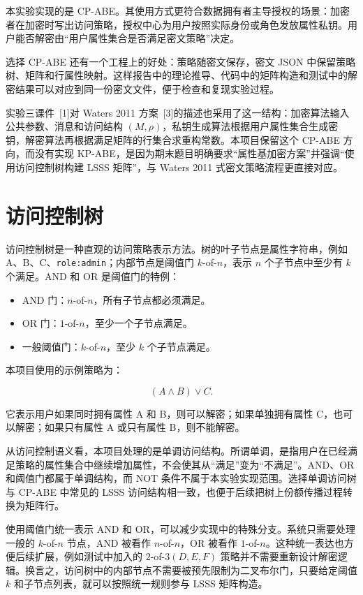 本实验实现的是 CP-ABE。其使用方式更符合数据拥有者主导授权的场景：加密者在加密时写出访问策略，授权中心为用户按照实际身份或角色发放属性私钥。用户能否解密由“用户属性集合是否满足密文策略”决定。

选择 CP-ABE 还有一个工程上的好处：策略随密文保存，密文 JSON 中保留策略树、矩阵和行属性映射。这样报告中的理论推导、代码中的矩阵构造和测试中的解密结果可以对应到同一份密文文件，便于检查和复现实验过程。

实验三课件~[1]对 Waters 2011 方案~[3]的描述也采用了这一结构：加密算法输入公共参数、消息和访问结构 $(M,\rho)$，私钥生成算法根据用户属性集合生成密钥，解密算法再根据满足矩阵的行集合求重构常数。本项目保留这个 CP-ABE 方向，而没有实现 KP-ABE，是因为期末题目明确要求“属性基加密方案”并强调“使用访问控制树构建 LSSS 矩阵”，与 Waters 2011 式密文策略流程更直接对应。

\section{访问控制树}

访问控制树是一种直观的访问策略表示方法。树的叶子节点是属性字符串，例如 A、B、C、\verb|role:admin|；内部节点是阈值门 $k$-of-$n$，表示 $n$ 个子节点中至少有 $k$ 个满足。AND 和 OR 是阈值门的特例：

\begin{itemize}
    \item AND 门：$n$-of-$n$，所有子节点都必须满足。
    \item OR 门：$1$-of-$n$，至少一个子节点满足。
    \item 一般阈值门：$k$-of-$n$，至少 $k$ 个子节点满足。
\end{itemize}

本项目使用的示例策略为：

\[
    (A \wedge B)\vee C.
\]

它表示用户如果同时拥有属性 A 和 B，则可以解密；如果单独拥有属性 C，也可以解密；如果只有属性 A 或只有属性 B，则不能解密。

从访问控制语义看，本项目处理的是单调访问结构。所谓单调，是指用户在已经满足策略的属性集合中继续增加属性，不会使其从“满足”变为“不满足”。AND、OR 和阈值门都属于单调结构，而 NOT 条件不属于本实验实现范围。选择单调访问树与 CP-ABE 中常见的 LSSS 访问结构相一致，也便于后续把树上份额传播过程转换为矩阵行。

使用阈值门统一表示 AND 和 OR，可以减少实现中的特殊分支。系统只需要处理一般的 $k$-of-$n$ 节点，AND 被看作 $n$-of-$n$，OR 被看作 $1$-of-$n$。这种统一表达也方便后续扩展，例如测试中加入的 $2$-of-$3(D,E,F)$ 策略并不需要重新设计解密逻辑。换言之，访问树中的内部节点不需要被预先限制为二叉布尔门，只要给定阈值 $k$ 和子节点列表，就可以按照统一规则参与 LSSS 矩阵构造。

